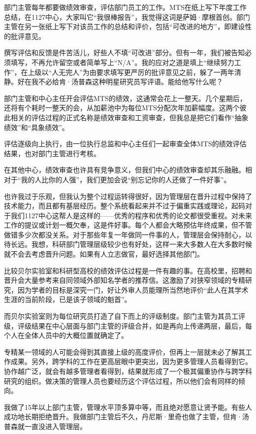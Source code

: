 \documentclass[a4paper,12pt,UTF8,twoside]{ctexbook}
\begin{document}
部门主管每年都要做绩效审查，评估部门员工的工作。MTS在纸上写下年度工作总结，在1127中心，大家叫它“我很棒报告”，我觉得这词是萨姆·摩根首创。部门主管在另一张纸上写下对该员工作的总结和评价，包括“可改进的地方”，即建设性的批评意见。

撰写评估和反馈是件苦活儿，好些人不填“可改进”部分。但有一年，我们被告知必须填写，不再允许留空或者简单写上“N/A”。我的应对之道是填上“继续努力工作”，在上级以“人无完人”为由要求填写更严厉的批评意见之前，躲了一两年清静。好在我不必给肯·汤普森这种明星研究员写评语。能给他写什么呢？

部门主管和中心主任开会评估MTS的绩效，这通常会花上一整天。几个星期后，还将有个耗时一整天的会，从加薪池中为每位MTS分配次年加薪幅度。这两个彼此相关的评估过程的正式名称是绩效审查和工资审查，但我总是把它们看作“抽象绩效”和“具象绩效”。

评估逐级向上执行，由一位执行总监和中心主任们一起审查全体MTS的绩效评估结果，也对部门主管进行考核。

在其他中心，绩效审查也许具有竞争意义，但我们中心的绩效审查却其乐融融。相对于“我的人比你的人强”，我们更加会说“别忘记你的人还做了一件好事”。

也许我过于乐观，但我认为整个过程运转得很好，因为管理层在晋升过程中保持了技术能力，而且都有基层经历。整个系统看起来并不过于偏重实践或理论，起码对于我们1127中心这帮人是这样的——优秀的程序和优秀的论文都很受重视。对未来工作的提议或计划一概欠奉，这是件好事。每个人都会大略预估年终成果，但不管做错多少次都没关系。对于那些年复一年做同一件事的人，管理层会保持耐心，以待长远。我想，科研部门管理层级较少也有好处，这样一来大多数人在大多数时候就不会去考虑晋升问题。如果有人立志做官，最好选择其他部门。

比较贝尔实验室和科研型高校的绩效评估过程是一件有趣的事。在高校里，招聘和晋升会大量参考来自同领域外部知名学者的推荐信。这激励了对狭窄领域的专精研究，因为学者的目标是深究一门，好让外审人员能理所当然地评价“此人在其学术生涯的当前阶段，已是该子领域的魁首”。

而贝尔实验室则为每位研究员打造了自下而上的评级制度。部门主管为其员工评级，评级结果在中心层面与部门主管的评级合并，如是再向上传递两层，最后，每个人在全体人员中的大概位置就确定了。

专精某一领域的人可能会得到其直接上级的高度评价，但再上一层就未必了解其工作成果。另外，跨学科的工作在更高层眼中更突出，因为更多管理人员看得到它。协作越广泛，就会有越多管理者看得到，结果就形成了一个极其偏重协作与跨学科研究的组织。做决策的管理人员也要经历这个评估过程，所以他们会有同样的倾向。

我做了15年以上部门主管，管理水平顶多算中等，而且绝对愿意让贤予能。有些人成功地长期拒绝晋升。我做部门主管后不久，丹尼斯·里奇也做了主管，但肯·汤普森就一直没进入管理层。
\end{document}
